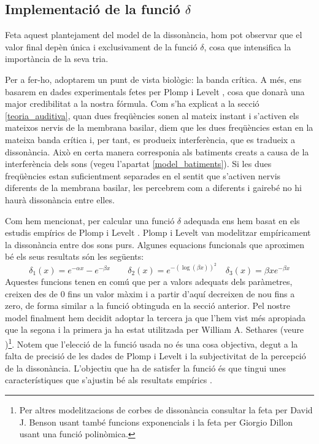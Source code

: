 \documentclass{article}
\theoremstyle{math}
\newcommand{\0}{\ensuremath{\vb{0}}}
\begin{document}
\subsection{Implementació de la funció \texorpdfstring{$\delta$}{d}} 
Feta aquest plantejament del model de la dissonància, hom pot observar que el valor final depèn única i exclusivament de la funció $\delta$, cosa que intensifica la importància de la seva tria.\par
Per a fer-ho, adoptarem un punt de vista biològic: la banda crítica. A més, ens basarem en dades experimentals fetes per Plomp i Levelt \cite{plomp}, cosa que donarà una major credibilitat a la nostra fórmula. Com s'ha explicat a la secció \ref{teoria_auditiva}, quan dues freqüències sonen al mateix instant i s'activen els mateixos nervis de la membrana basilar, diem que les dues freqüències estan en la mateixa banda crítica i, per tant, es produeix interferència, que es tradueix a dissonància. Això en certa manera corresponia als batiments creats a causa de la interferència dels sons (vegeu l'apartat \ref{model_batiments}). Si les dues freqüències estan suficientment separades en el sentit que s'activen nervis diferents de la membrana basilar, les percebrem com a diferents i gairebé no hi haurà dissonància entre elles.\par 
Com hem mencionat, per calcular una funció $\delta$ adequada ens hem basat en els estudis empírics de Plomp i Levelt \cite{plomp}. Plomp i Levelt van modelitzar empíricament la dissonància entre dos sons purs. Algunes equacions funcionals que aproximen bé els seus resultats són les següents: $$\delta_1(x)=e^{-\alpha x}-e^{-\beta x}\qquad\delta_2(x)=e^{-\left(\log(\beta x)\right)^2}\quad\delta_3(x)=\beta xe^{-\beta x}$$
Aquestes funcions tenen en comú que per a valors adequats dels paràmetres, creixen des de 0 fins un valor màxim i a partir d'aquí decreixen de nou fins a zero, de forma similar a la funció obtinguda en la secció anterior. Pel nostre model finalment hem decidit adoptar la tercera ja que l'hem vist més apropiada que la segona i la primera ja ha estat utilitzada per William A. Sethares (veure \cite{sethares1})\footnote{Per altres modelitzacions de corbes de dissonància consultar la feta per David J. Benson \cite{benson} usant també funcions exponencials i la feta per Giorgio Dillon \cite{dillon} usant una funció polinòmica.}. Notem que l'elecció de la funció usada no és una cosa objectiva, degut a la falta de precisió de les dades de Plomp i Levelt i la subjectivitat de la percepció de la dissonància. L'objectiu que ha de satisfer la funció és que tingui unes característiques que s'ajustin bé als resultats empírics \cite{benson}.\par
\end{document}
